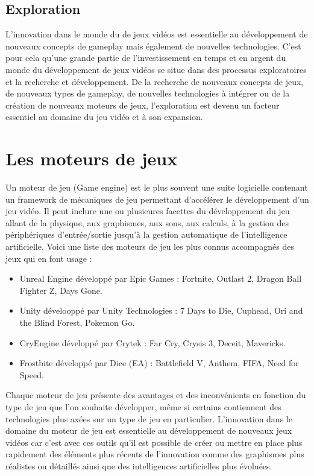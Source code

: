 \subsection{Exploration}
L'innovation dans le monde du de jeux vidéos est essentielle au développement de nouveaux concepts de gameplay mais également de nouvelles technologies. C'est pour cela qu'une grande partie de l'investissement en temps et en argent du monde du développement de jeux vidéos se situe dans des processus exploratoires et la recherche et développement. De la recherche de nouveaux concepts de jeux, de nouveaux types de gameplay, de nouvelles technologies à intégrer ou de la création de nouveaux moteurs de jeux, l'exploration est devenu un facteur essentiel au domaine du jeu vidéo et à son expansion.



\section{Les moteurs de jeux}
Un moteur de jeu (Game engine) est le plus souvent une suite logicielle contenant un framework de mécaniques de jeu permettant d'accélérer le développement d'un jeu vidéo. Il peut inclure une ou plusieures facettes du développement du jeu allant de la physique, aux graphismes, aux sons, aux calculs, à la gestion des périphériques d'entrée/sortie jusqu'à la gestion automatique de l'intelligence artificielle. Voici une liste des moteurs de jeu les plus connus accompagnés des jeux qui en font usage : 
\begin{itemize}
    \item Unreal Engine développé par Epic Games : Fortnite, Outlast 2, Dragon Ball Fighter Z, Days Gone.
    \item Unity dévelooppé par Unity Technologies : 7 Days to Die, Cuphead, Ori and the Blind Forest, Pokemon Go.
    \item CryEngine développé par Crytek : Far Cry, Crysis 3, Deceit, Mavericks.
    \item Frostbite développé par Dice (EA) : Battlefield V, Anthem, FIFA, Need for Speed.
\end{itemize}

Chaque moteur de jeu présente des avantages et des inconvénients en fonction du type de jeu que l'on souhaite développer, même si certains contiennent des technologies plus axées sur un type de jeu en particulier. L'innovation dans le domaine du moteur de jeu est essentielle au développement de nouveaux jeux vidéos car c'est avec ces outils qu'il est possible de créer ou mettre en place plus rapidement des éléments plus récents de l'innovation comme des graphismes plus réalistes ou détaillés ainsi que des intelligences artificielles plus évoluées.

